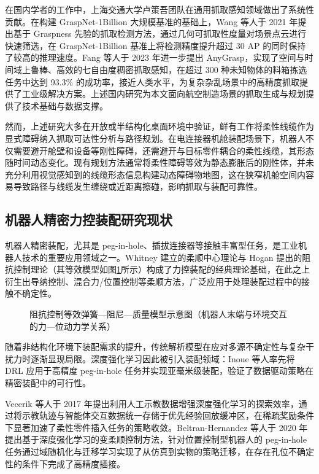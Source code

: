 在国内学者的工作中，上海交通大学卢策吾团队在通用抓取感知领域做出了系统性贡献。在构建 GraspNet-1Billion 大规模基准\cite{Fang2020}的基础上，Wang 等人于 2021 年提出基于 Graspness 先验的抓取检测方法\cite{Wang2021graspness}，通过几何可抓取性度量对场景点云进行快速筛选，在 GraspNet-1Billion 基准上将检测精度提升超过 30 AP 的同时保持了较高的推理速度。Fang 等人于 2023 年进一步提出 AnyGrasp\cite{Fang2023anygrasp}，实现了空间与时间域上鲁棒、高效的七自由度稠密抓取感知，在超过 300 种未知物体的料箱拣选任务中达到 93.3\% 的成功率，接近人类水平，为复杂杂乱场景中的高精度抓取提供了工业级解决方案。上述国内研究为本文面向航空制造场景的抓取生成与规划提供了技术基础与数据支撑。

然而，上述研究大多在开放或半结构化桌面环境中验证，鲜有工作将柔性线缆作为显式障碍纳入抓取可达性分析与路径规划。在电连接器机舱装配场景下，机器人不仅需要避开舱壁和设备等刚性障碍，还需避开与目标零件耦合的柔性线缆，其形态随时间动态变化。现有规划方法通常将柔性障碍等效为静态膨胀后的刚性体，并未充分利用视觉感知到的线缆形态信息构建动态障碍物地图，这在狭窄机舱空间内容易导致路径与线缆发生缠绕或近距离擦碰，影响抓取与装配可靠性。

\subsection{机器人精密力控装配研究现状}

机器人精密装配，尤其是 peg-in-hole、插拔连接器等接触丰富型任务，是工业机器人技术的重要应用领域之一。Whitney\cite{Whitney1982} 建立的柔顺中心理论与 Hogan\cite{Hogan1985} 提出的阻抗控制理论（其等效模型如图\ref{fig:ch1:impedance}所示）构成了力控装配的经典理论基础，在此之上衍生出导纳控制、混合力/位置控制等柔顺方法，广泛应用于处理装配过程中的接触不确定性。

\begin{figure}[htbp]
  \centering
  \caption{阻抗控制等效弹簧—阻尼—质量模型示意图（机器人末端与环境交互的力—位动力学关系）}
  \label{fig:ch1:impedance}
\end{figure}

随着非结构化环境下装配需求的提升，传统解析模型在应对多源不确定性与复杂干扰力时逐渐显现局限。深度强化学习因此被引入装配领域：Inoue 等人\cite{Inoue2017}率先将 DRL 应用于高精度 peg-in-hole 任务并实现亚毫米级装配，验证了数据驱动策略在精密装配中的可行性。

Vecerik 等人于 2017 年提出利用人工示教数据增强深度强化学习的探索效率\cite{Vecerik2017}，通过将示教轨迹与智能体交互数据统一存储于优先经验回放缓冲区，在稀疏奖励条件下显著加速了柔性零件插入任务的策略收敛。Beltran-Hernandez 等人于 2020 年提出基于深度强化学习的变柔顺控制方法\cite{Beltran2020}，针对位置控制型机器人的 peg-in-hole 任务通过域随机化与迁移学习实现了从仿真到实物的策略迁移，在存在孔位不确定性的条件下完成了高精度插接。

